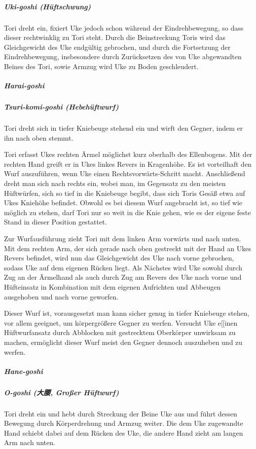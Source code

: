 \documentclass[justified, a4paper, notitlepage, captions=tableheading, nobib]{tufte-handout}
\begin{document}
\subparagraph{Uki-goshi (Hüftschwung)}
\label{sec:orgc513f86}
Tori dreht ein, fixiert Uke jedoch schon während der Eindrehbewegung, so dass dieser rechtwinklig zu Tori steht. Durch die Beinstreckung Toris wird das Gleichgewicht des Uke endgültig gebrochen, und durch die Fortsetzung der Eindrehbewegung, insbesondere durch Zurücksetzen des von Uke abgewandten Beines des Tori, sowie Armzug wird Uke zu Boden geschleudert.

\subparagraph{Harai-goshi}
\label{sec:orgeeb1a26}
\subparagraph{Tsuri-komi-goshi (Hebehüftwurf)}
\label{sec:org06a3b0f}
Tori dreht sich in tiefer Kniebeuge stehend ein und wirft den Gegner, indem er ihn nach oben stemmt.

Tori erfasst Ukes rechten Ärmel möglichst kurz oberhalb des Ellenbogens. Mit der rechten Hand greift er in Ukes linkes Revers in Kragenhöhe. Es ist vorteilhaft den Wurf auszuführen, wenn Uke einen Rechtsvorwärts-Schritt macht.
Anschließend dreht man sich nach rechts ein, wobei man, im Gegensatz zu den meisten Hüftwürfen, sich so tief in die Kniebeuge begibt, dass sich Toris Gesäß etwa auf Ukes Kniehöhe befindet. Obwohl es bei diesem Wurf angebracht ist, so tief wie möglich zu stehen, darf Tori nur so weit in die Knie gehen, wie es der eigene feste Stand in dieser Position gestattet.

Zur Wurfausführung zieht Tori mit dem linken Arm vorwärts und nach unten. Mit dem rechten Arm, der sich gerade nach oben gestreckt mit der Hand an Ukes Revers befindet, wird nun das Gleichgewicht des Uke nach vorne gebrochen, sodass Uke auf dem eigenen Rücken liegt. Als Nächstes wird Uke sowohl durch Zug an der Ärmelhand als auch durch Zug am Revers des Uke nach vorne und Hüfteinsatz in Kombination mit dem eigenen Aufrichten und Abbeugen ausgehoben und nach vorne geworfen.

Dieser Wurf ist, vorausgesetzt man kann sicher genug in tiefer Kniebeuge stehen, vor allem geeignet, um körpergrößere Gegner zu werfen.
Versucht Uke e[[inen Hüftwurfansatz durch Abblocken mit gestrecktem Oberkörper unwirksam zu machen, ermöglicht dieser Wurf meist den Gegner dennoch auszuheben und zu werfen.

\subparagraph{Hane-goshi}
\label{sec:orgb1b2e54}
\subparagraph{O-goshi (大腰, Großer Hüftwurf)}
\label{sec:orgb46817f}
Tori dreht ein und hebt durch Streckung der Beine Uke aus und führt dessen Bewegung durch Körperdrehung und Armzug weiter. Die dem Uke zugewandte Hand schiebt dabei auf dem Rücken des Uke, die andere Hand zieht am langen Arm nach unten.
\end{document}
